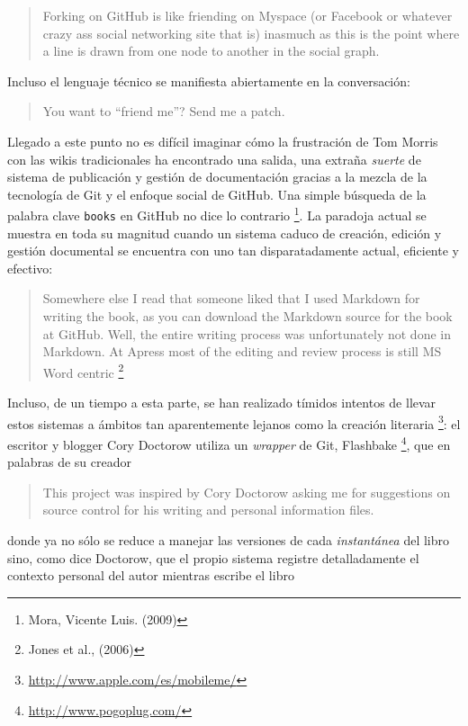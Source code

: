 \documentclass[12pt, a4paper,twoside]{book}
\begin{document}
\begin{quote}
Forking on GitHub is like friending on Myspace (or Facebook or
whatever crazy ass social networking site that is) inasmuch as this
is the point where a line is drawn from one node to another in the
social graph.

\end{quote}
Incluso el lenguaje técnico se manifiesta abiertamente en la
conversación:

\begin{quote}
You want to ``friend me''? Send me a patch.

\end{quote}
Llegado a este punto no es difícil imaginar cómo la frustración de
Tom Morris con las wikis tradicionales ha encontrado una salida,
una extraña \emph{suerte} de sistema de publicación y gestión de
documentación gracias a la mezcla de la tecnología de Git y el
enfoque social de GitHub. Una simple búsqueda de la palabra clave
\verb!books! en GitHub no dice lo contrario%
\footnote{Mora, Vicente Luis. (2009)}.
La paradoja actual se muestra en toda su magnitud cuando un sistema
caduco de creación, edición y gestión documental se encuentra con
uno tan disparatadamente actual, eficiente y efectivo:

\begin{quote}
Somewhere else I read that someone liked that I used Markdown for
writing the book, as you can download the Markdown source for the
book at GitHub. Well, the entire writing process was unfortunately
not done in Markdown. At Apress most of the editing and review
process is still MS Word centric%
\footnote{Jones et al., (2006)}

\end{quote}
Incluso, de un tiempo a esta parte, se han realizado tímidos
intentos de llevar estos sistemas a ámbitos tan aparentemente
lejanos como la creación literaria%
\footnote{\href{http://www.apple.com/es/mobileme/}{http://www.apple.com/es/mobileme/}}:
el escritor y blogger Cory Doctorow utiliza un \emph{wrapper} de
Git, Flashbake%
\footnote{\href{http://www.pogoplug.com/}{http://www.pogoplug.com/}},
que en palabras de su creador

\begin{quote}
This project was inspired by Cory Doctorow asking me for
suggestions on source control for his writing and personal
information files.

\end{quote}
donde ya no sólo se reduce a manejar las versiones de cada
\emph{instantánea} del libro sino, como dice Doctorow, que el
propio sistema registre detalladamente el contexto personal del
autor mientras escribe el libro
\end{document}
